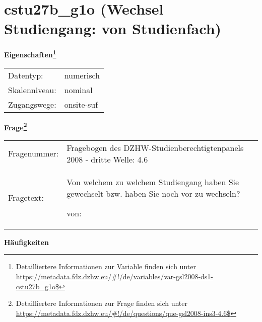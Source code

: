 
    \setcounter{footnote}{0}

    \vspace*{-1.8cm}
	\section{cstu27b\_g1o (Wechsel Studiengang: von Studienfach)}
	\label{section:cstu27b_g1o}



    \vspace*{0.5cm}
    \noindent\textbf{Eigenschaften\footnote{Detailliertere Informationen zur Variable finden sich unter
		\url{https://metadata.fdz.dzhw.eu/\#!/de/variables/var-gsl2008-ds1-cstu27b_g1o$}}}\\
	\begin{tabularx}{\hsize}{@{}lX}
	Datentyp: & numerisch \\
	Skalenniveau: & nominal \\
	Zugangswege: &
	  onsite-suf
 \\
    \end{tabularx}



				\vspace*{0.5cm}
                \noindent\textbf{Frage\footnote{Detailliertere Informationen zur Frage finden sich unter
		              \url{https://metadata.fdz.dzhw.eu/\#!/de/questions/que-gsl2008-ins3-4.6$}}}\\
				\begin{tabularx}{\hsize}{@{}lX}
					Fragenummer: &
					  Fragebogen des DZHW-Studienberechtigtenpanels 2008 - dritte Welle:
					  4.6
 \\
					Fragetext: & Von welchem zu welchem Studiengang haben Sie gewechselt bzw. haben Sie noch vor zu wechseln?\par  von: \\
				\end{tabularx}





        		\vspace*{0.5cm}
                \noindent\textbf{Häufigkeiten}

